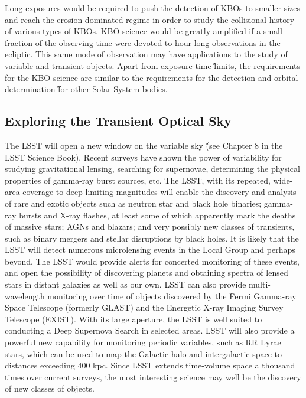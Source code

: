 Long exposures would be required to push the detection of KBOs to smaller
sizes and reach the erosion-dominated regime in order to study the
collisional history of various types of KBOs. KBO science would be greatly
amplified if a small fraction of the observing time were devoted to
hour-long observations in the ecliptic. This same mode of observation may
have applications to the study of variable and transient objects. Apart
from exposure time \G{limits}, the requirements for the KBO
science are similar to the requirements for the detection and
orbital determination \G{for other Solar System bodies}.



\subsection{Exploring the Transient Optical Sky}
\label{sec:transients}

The LSST will open a new window on the variable sky \G{(see Chapter 8 in
the LSST Science Book)}. Recent surveys have
shown the power of variability for studying gravitational lensing,
searching for supernovae, determining the physical properties of gamma-ray
burst sources, etc. The LSST, with its repeated, wide-area coverage to deep
limiting magnitudes will enable the discovery and analysis of rare and
exotic objects such as neutron star and black hole binaries; gamma-ray
bursts and X-ray flashes, at least some of which apparently mark the deaths
of massive stars; AGNs and blazars; and very possibly new classes of
transients, such as binary mergers and stellar disruptions by black holes.
It is likely that the LSST will detect
numerous microlensing events in the Local Group and perhaps beyond.  The
LSST would provide alerts for concerted monitoring of these events, and
open the possibility of discovering planets and obtaining spectra of lensed
stars in distant galaxies as well as our own.  LSST can also provide
multi-wavelength monitoring over time of objects discovered by the
\G{Fermi Gamma-ray Space Telescope (formerly GLAST)}
and the Energetic X-ray Imaging Survey Telescope (EXIST). With its large aperture, the LSST is well
suited to conducting a Deep Supernova Search in selected areas.  LSST will
also provide a powerful new capability for monitoring periodic variables,
such as RR Lyrae stars, which can be used to map the Galactic halo and
intergalactic space to distances exceeding 400 kpc. Since LSST extends
time-volume space a thousand times over current surveys, the most
interesting science may well be the discovery of new classes of objects.

